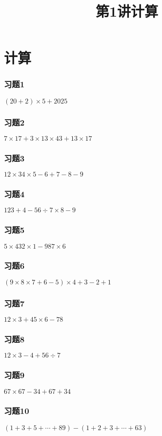 \section{计算}

\title[第1讲\quad 计算]{第1讲\quad 计算} 
\author{}
\date{}
\begin{frame}
    \titlepage
\end{frame}

\begin{frame}
    \frametitle{习题1}
    \centering\textit{\Large $(20+2)\times 5 + 2025$}
\end{frame}

\begin{frame}
    \frametitle{习题2}
    \centering\textit{\Large $7\times 17 + 3\times 13\times 43 + 13\times 17$}
\end{frame}

\begin{frame}
    \frametitle{习题3}
    \centering\textit{\Large $12\times 34\times 5 - 6 + 7 - 8 - 9$}
\end{frame}


\begin{frame}
    \frametitle{习题4}
    \centering\textit{\Large $123 + 4 - 56\div 7\times 8 - 9$}
\end{frame}

\begin{frame}
    \frametitle{习题5}
    \centering\textit{\Large $5\times 432\times 1 - 98 7\times 6$}
\end{frame}


\begin{frame}
    \frametitle{习题6}
    \centering\textit{\Large $(9\times 8\times 7 + 6 - 5)\times 4 + 3 -2 +1$}
\end{frame}


\begin{frame}
    \frametitle{习题7}
    \centering\textit{\Large $12\times 3 + 45\times 6 - 78$}
\end{frame}

\begin{frame}
    \frametitle{习题8}
    \centering\textit{\Large $12\times 3 - 4 + 56\div 7$}
\end{frame}


\begin{frame}
    \frametitle{习题9}
    \centering\textit{\Large $67\times 67 - 34 + 67 + 34$}
\end{frame}


\begin{frame}
    \frametitle{习题10}
    \centering\textit{\Large $(1+3+5+\cdots + 89) - (1+2+3+\cdots + 63)$}
\end{frame}


